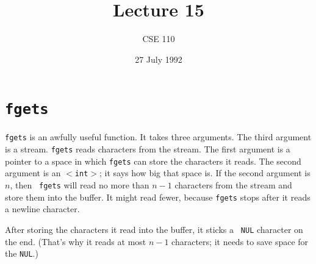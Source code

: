 %
%
%


\def\brac#1{$<$#1$>$}
\def\Int{{\tt int}}
\def\int{\brac{\Int}}
\def\int{\brac{\Int}}
\def\Shortint{{\tt short~int}}
\def\shortint{\brac{\Shortint}}
\def\Longint{{\tt long~int}}
\def\longint{\brac{\Longint}}
\def\Float{{\tt float}}
\def\float{\brac{\Float}}
\def\Double{{\tt double}}
\def\double{\brac{\Double}}
\def\Char{{\tt char}}
\def\chr{\brac{\Char}}
\def\Void{{\tt void}}
\def\void{\brac{\Void}}

\def\ptr#1{pointer~to #1}
\def\p2#1{\brac{\ptr#1}}
\def\Ano#1#2{array~of {#1}~#2s}
\def\ano#1#2{\brac{\Ano#1#2}}
\def\Ao#1{array~of #1}
\def\ao#1{\brac{\Ao#1}}

\def\np{{\tt NULL} pointer}

\def\breakhere{\mbox{$\otimes$}}
\parskip 8pt


\title{Lecture 15}
\author{CSE 110}
\date{27 July 1992}

\pagestyle{fancy}
\rhead{\thepage}
\cfoot{}





\maketitle

\section{{\tt fgets}}

{\tt fgets} is an awfully useful function.  It takes three arguments.
The third argument is a stream.  {\tt fgets} reads characters from the
stream.  The first argument is a pointer to a space in which {\tt fgets}
can store the characters it reads.  The second argument is an \int; it
says how big that space is.  If the second argument is $n$, then {\tt
fgets} will read no more than $n-1$ characters from the stream and store
them into the buffer.  It might read fewer, because {\tt fgets} stops
after it reads a newline character.  

After storing the characters it read into the buffer, it sticks a {\tt
NUL} character on the end.  (That's why it reads at most $n-1$
characters; it needs to save space for the {\tt NUL}.)  


